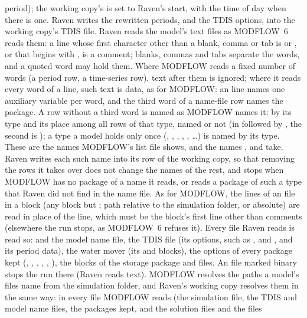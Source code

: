 period); the working copy's  is set to Raven's start, with the time of day when there is one.
Raven writes the rewritten periods, and the TDIS options, into the working copy's TDIS file. Raven reads the model's text files as
MODFLOW~6 reads them: a line whose first character other than a blank, comma or tab is \cmd{\#} or \cmd{!}, or that
begins with \cmd{//}, is a comment; blanks, commas and tabs separate the words, and a quoted word may hold them. Where
MODFLOW reads a fixed number of words (a period row, a time-series row), text after them is ignored; where it reads
every word of a line, such text is data, as for MODFLOW: an  line names one auxiliary variable per word,
and the third word of a name-file  row names the package. A row without a third word is named as MODFLOW
names it: by its type and its place among all rows of that type, named or not (in  followed by
, the second is ); a type a model holds only once (, , , ,
, \ldots) is named by its type. These are the names MODFLOW's list file shows, and the names
,  and  take. Raven writes each such name into its row of
the working copy, so that removing the rows it takes over does not change the names of the rest, and stops when MODFLOW
has no package of a name it reads, or reads a package of such a type that Raven did not find in the name file. As for
MODFLOW, the lines of an  file in a block (any block but ; path relative to the simulation
folder, or absolute) are read in place of the  line, which must be the block's first line other than
comments (elsewhere the run stops, as MODFLOW~6 refuses it). Every file Raven reads is read so:  and the
model name file, the TDIS file (its options, such as ,  and , and its
period data), the water mover (its  and  blocks), the options of every package kept (,
, , , , ), the  blocks of the storage package and
 files. An  file marked binary stops the run there (Raven reads text). MODFLOW resolves the
paths a model's files name from the simulation folder, and Raven's working copy resolves them in the same way: in every file
MODFLOW reads (the simulation file, the TDIS and model name files, the packages kept, and the solution files and the files
